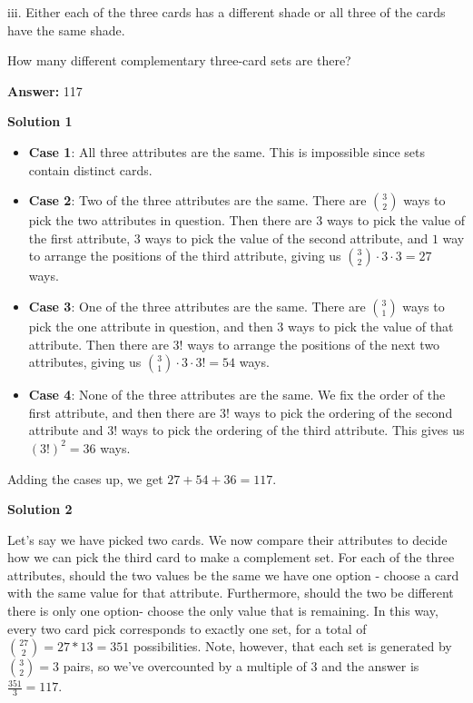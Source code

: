 \begin{enumerate}
 iii. Either each of the three cards has a different shade or all three of the cards have the same shade.


 How many different complementary three-card sets are there?


 
 \textbf{Answer: }117



\textbf{Solution 1}


            \begin{itemize}
        \item \textbf{Case 1}: All three attributes are the same. This is impossible since sets contain distinct cards.
        \item \textbf{Case 2}: Two of the three attributes are the same. There are ${3\choose 2}$ ways to pick the two attributes in question. Then there are $3$ ways to pick the value of the first attribute, $3$ ways to pick the value of the second attribute, and $1$ way to arrange the positions of the third attribute, giving us ${3\choose 2} \cdot 3 \cdot 3 = 27$ ways.
        \item \textbf{Case 3}: One of the three attributes are the same. There are ${3\choose 1}$ ways to pick the one attribute in question, and then $3$ ways to pick the value of that attribute. Then there are $3!$ ways to arrange the positions of the next two attributes, giving us ${3\choose 1} \cdot 3 \cdot 3! = 54$ ways.
        \item \textbf{Case 4}: None of the three attributes are the same. We fix the order of the first attribute, and then there are $3!$ ways to pick the ordering of the second attribute and $3!$ ways to pick the ordering of the third attribute. This gives us $(3!)^2 = 36$ ways.
            \end{itemize}
            Adding the cases up, we get $27 + 54 + 36 = \boxed{117}$.

 



\textbf{Solution 2}

Let's say we have picked two cards. We now compare their attributes to decide how we can pick the third card to make a complement set. For each of the three attributes, should the two values be the same we have one option - choose a card with the same value for that attribute. Furthermore, should the two be different there is only one option- choose the only value that is remaining. In this way, every two card pick corresponds to exactly one set, for a total of $\binom{27}{2} = 27*13 = 351$ possibilities. Note, however, that each set is generated by ${3\choose 2} = 3$ pairs, so we've overcounted by a multiple of 3 and the answer is $\frac{351}{3} = \boxed{117}$.


\end{enumerate}
